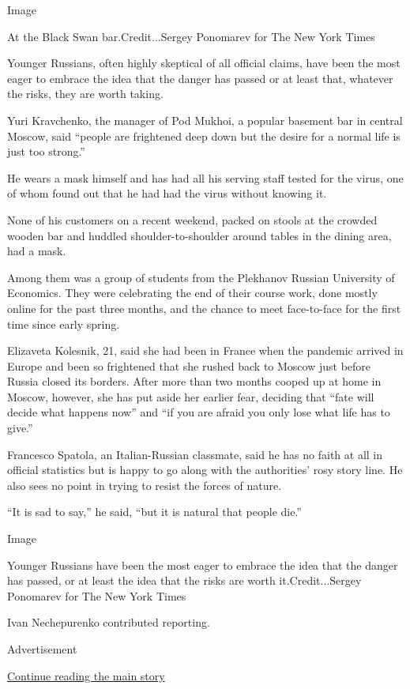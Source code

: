 Image

At the Black Swan bar.Credit...Sergey Ponomarev for The New York Times

Younger Russians, often highly skeptical of all official claims, have
been the most eager to embrace the idea that the danger has passed or at
least that, whatever the risks, they are worth taking.

Yuri Kravchenko, the manager of Pod Mukhoi, a popular basement bar in
central Moscow, said ``people are frightened deep down but the desire
for a normal life is just too strong.''

He wears a mask himself and has had all his serving staff tested for the
virus, one of whom found out that he had had the virus without knowing
it.

None of his customers on a recent weekend, packed on stools at the
crowded wooden bar and huddled shoulder-to-shoulder around tables in the
dining area, had a mask.

Among them was a group of students from the Plekhanov Russian University
of Economics. They were celebrating the end of their course work, done
mostly online for the past three months, and the chance to meet
face-to-face for the first time since early spring.

Elizaveta Kolesnik, 21, said she had been in France when the pandemic
arrived in Europe and been so frightened that she rushed back to Moscow
just before Russia closed its borders. After more than two months cooped
up at home in Moscow, however, she has put aside her earlier fear,
deciding that ``fate will decide what happens now'' and ``if you are
afraid you only lose what life has to give.''

Francesco Spatola, an Italian-Russian classmate, said he has no faith at
all in official statistics but is happy to go along with the
authorities' rosy story line. He also sees no point in trying to resist
the forces of nature.

``It is sad to say,'' he said, ``but it is natural that people die.''

Image

Younger Russians have been the most eager to embrace the idea that the
danger has passed, or at least the idea that the risks are worth
it.Credit...Sergey Ponomarev for The New York Times

Ivan Nechepurenko contributed reporting.

Advertisement

\protect\hyperlink{after-bottom}{Continue reading the main story}

